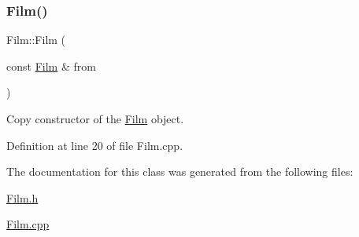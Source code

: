 \subsubsection{\texorpdfstring{Film()}{Film()}\hspace{0.1cm}{\footnotesize\ttfamily [2/2]}}
{\footnotesize\ttfamily Film\+::\+Film (\begin{DoxyParamCaption}\item[{const \mbox{\hyperlink{class_film}{Film}} \&}]{from }\end{DoxyParamCaption})}



Copy constructor of the \mbox{\hyperlink{class_film}{Film}} object. 



Definition at line 20 of file Film.\+cpp.


\begin{DoxyCode}{0}

\end{DoxyCode}


The documentation for this class was generated from the following files\+:\begin{DoxyCompactItemize}
\item 
\mbox{\hyperlink{_film_8h}{Film.\+h}}\item 
\mbox{\hyperlink{_film_8cpp}{Film.\+cpp}}\end{DoxyCompactItemize}
